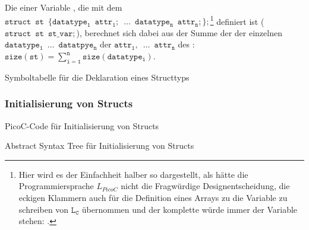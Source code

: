 \begin{Special_Paragraph}
  Die  einer Variable , die mit dem  $\mathtt{struct\enspace st\enspace \{datatype_1\enspace attr_1;\enspace}\allowbreak \mathtt{\ldots\enspace datatype_n\enspace attr_n;\};}$\footnote{Hier wird es der Einfachheit halber so dargestellt, als hätte die Programmiersprache $L_{PicoC}$ nicht die Fragwürdige Designentscheidung, die eckigen Klammern \smalltt{[]} auch für die Definition eines Arrays zu  die Variable zu schreiben von $\mathtt{L_C}$ übernommen und der komplette  würde immer  der Variable stehen: .} definiert ist ($\mathtt{struct\enspace st\enspace st\_var;}$), berechnet sich dabei aus der Summe der  der einzelnen  $\mathtt{datatype_1\enspace \ldots\enspace datatpye_n}$ der  $\mathtt{attr_1,\enspace \ldots\enspace attr_n}$ des  : $\mathtt{size(st) = \sum^n_{i=1} size(datatype_i)}$.
\end{Special_Paragraph}

\begin{code}
  \centering
  \caption{Symboltabelle für die Deklaration eines Structtyps}
  \label{code:symboltabelle_für_die_deklaration_eines_structtyps}
\end{code}

\subsubsection{Initialisierung von Structs}
\begin{code}
  \centering
  \caption{PicoC-Code für Initialisierung von Structs}
  \label{code:picoc_code_für_initialisierung_von_structs}
\end{code}

\begin{code}
  \centering
  \caption{Abstract Syntax Tree für Initialisierung von Structs}
  \label{code:abstract_syntax_tree_für_initialisierung_von_structs}
\end{code}

